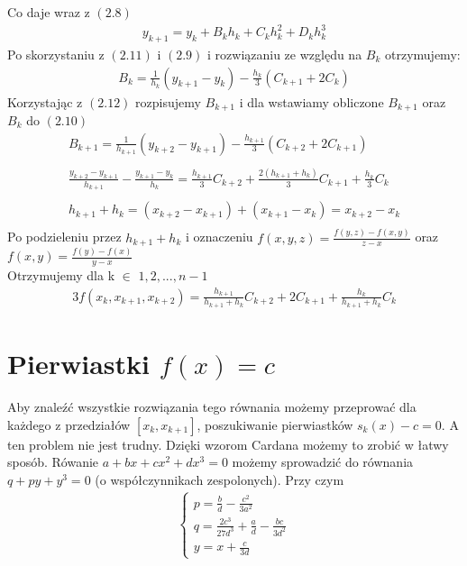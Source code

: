 \documentclass[paper=a4, fontsize=11pt]{scrartcl} %
\numberwithin{equation}{section} %
\numberwithin{figure}{section} %
\numberwithin{table}{section} %
\begin{document}
Co daje wraz z $(2.8)$
\begin{align}
y_{k+1} =  y_{k} + B_{k}h_{k} + C_{k}h_{k}^{2} + D_{k}h_{k}^3
\end{align}
\medbreak
Po skorzystaniu z $(2.11)$ i $(2.9)$ i rozwiązaniu ze względu na $B_{k}$ otrzymujemy:
\begin{align}
B_{k} = \frac{1}{h_{k}}(y_{k+1} - y_{k}) - \frac{h_{k}}{3}(C_{k+1} + 2C_{k})
\end{align}
\medbreak
Korzystając z $(2.12)$ rozpisujemy $B_{k+1}$ i dla wstawiamy obliczone $B_{k+1}$ oraz $B_{k}$ do $(2.10)$
\begin{align*}
B_{k+1} = \frac{1}{h_{k+1}}(y_{k+2} - y_{k+1}) - \frac{h_{k+1}}{3}(C_{k+2} + 2C_{k+1}) \\\\
\frac{y_{k+2} - y_{k+1}}{h_{k+1}} - \frac{y_{k+1} - y_{k}}{h_{k}} = \frac{h_{k+1}}{3}C_{k+2} + \frac{2(h_{k+1} +h_{k})}{3}C_{k+1} + \frac{h_{k}}{3}C_{k} \\\\
h_{k+1} + h_{k} = (x_{k+2} - x_{k+1}) + (x_{k+1} - x_{k}) = x_{k+2} -x_{k} \\
\end{align*}
Po podzieleniu przez $h_{k+1} + h_{k}$ i oznaczeniu $f(x,y,z) = \frac{f(y,z) - f(x,y)}{z-x}$ oraz $f(x,y) = \frac{f(y) - f(x)}{y-x}$ \\
Otrzymujemy dla k $\in$ $1, 2, ..., n-1$
\begin{align}
3f(x_{k}, x_{k+1}, x_{k+2}) = \frac{h_{k+1}}{h_{k+1} + h_{k}}C_{k+2} + 2C_{k+1} + \frac{h_{k}}{h_{k+1} + h_{k}}C_{k}
\end{align}



\section{Pierwiastki $f(x) = c$}

Aby znaleźć wszystkie rozwiązania tego równania możemy przeprować dla każdego z przedziałów $[x_{k}, x_{k+1}]$, poszukiwanie pierwiastków $s_{k}(x) - c = 0$.
A ten problem nie jest trudny. Dzięki wzorom Cardana możemy to zrobić w łatwy sposób.\medbreak
Rówanie $a + bx + cx^2 +dx^3 = 0$ możemy sprowadzić do równania $q + py + y^3 = 0$ (o współczynnikach zespolonych). \medbreak
Przy czym \medbreak
\begin{align}
\begin{cases}
p = \frac{b}{d} - \frac{c^2}{3a^2} \\
q = \frac{2c^3}{27d^3} + \frac{a}{d} - \frac{bc}{3d^2} \\
y = x + \frac{c}{3d}
\end{cases}
\end{align}
\end{document}
